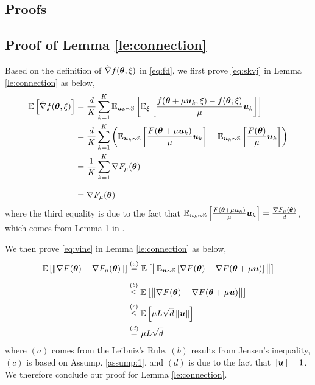 \begin{appendices}
\onecolumn

\section{Proofs}
\subsection{Proof of Lemma \ref{le:connection}}\label{proof:connection}
Based on the definition of $\hat{\nabla} f({\bm{\theta}}, \xi)$ in \eqref{eq:fd}, we first prove \eqref{eq:skvj} in Lemma \ref{le:connection} as below,
\begin{equation}
\begin{aligned}
\mathbb{E}\left[\hat{\nabla} f({\bm{\theta}}, \xi)\right] &= \frac{d}{K}\sum_{k=1}^K\mathbb{E}_{{\bm{u}}_k \sim {\mathbb{S}}}\left[\mathbb{E}_{\xi}\left[\frac{f({\bm{\theta}} + \mu {\bm{u}}_k; \xi) - f({\bm{\theta}}; \xi)}{\mu} {\bm{u}}_k\right]\right] \\
&= \frac{d}{K}\sum_{k=1}^K\left(\mathbb{E}_{{\bm{u}}_k \sim {\mathbb{S}}}\left[\frac{F({\bm{\theta}} + \mu {\bm{u}}_k)}{\mu} {\bm{u}}_k\right] - \mathbb{E}_{{\bm{u}}_k \sim {\mathbb{S}}}\left[\frac{F({\bm{\theta}})}{\mu}{\bm{u}}_k\right]\right) \\
&= \frac{1}{K}\sum_{k=1}^K \nabla F_{\mu}({\bm{\theta}}) \\[8pt]
&= \nabla F_{\mu}({\bm{\theta}})
\end{aligned}
\end{equation}
where the third equality is due to the fact that $\mathbb{E}_{{\bm{u}}_k \sim {\mathbb{S}}}\left[\frac{F({\bm{\theta}} + \mu {\bm{u}}_k)}{\mu} {\bm{u}}_k\right] = \frac{\nabla F_{\mu}({\bm{\theta}})}{d}$, which comes from Lemma 1 in \citep{flaxman2004online}.

We then prove \eqref{eq:vine} in Lemma \ref{le:connection} as below,
\begin{equation}
\begin{aligned}
\mathbb{E}\left[\left\|\nabla
F({\bm{\theta}}) - \nabla
F_{\mu}({\bm{\theta}})\right\|\right] &\stackrel{(a)}{=} \mathbb{E}\left[\big\|\mathbb{E}_{{\bm{u}} \sim {\mathbb{S}}}\left[\nabla F({\bm{\theta}}) - \nabla F({\bm{\theta}} + \mu {\bm{u}})\right]\big\|\right] \\[5pt]
&\stackrel{(b)}{\leq} \mathbb{E}\left[\big\|\nabla F({\bm{\theta}}) - \nabla F({\bm{\theta}} + \mu {\bm{u}})\big\|\right] \\[2pt]
&\stackrel{(c)}{\leq} \mathbb{E}\left[\mu L \sqrt{d} \left\|{\bm{u}}\right\|\right] \\
&\stackrel{(d)}{=} \mu L \sqrt{d}
\end{aligned}
\end{equation}
where $(a)$ comes from the Leibniz's Rule, $(b)$ results from Jensen's inequality, $(c)$ is based on Assump. \ref{assump:1}, and $(d)$ is due to the fact that $\left\|{\bm{u}}\right\| = 1$. We therefore conclude our proof for Lemma \ref{le:connection}.


\end{appendices}
